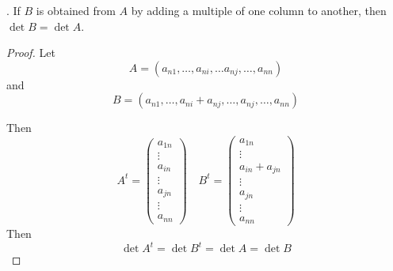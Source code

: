 \documentclass[12pt, a4paper]{article}
\begin{document}
. If $B$ is obtained from $A$ by adding a multiple of one column to another,
then $\det B = \det A$.
\begin{proof}
    Let 
    \[
        A = \left(a_{n1}, \dots, a_{ni}, \dots a_{nj}, \dots, a_{nn}\right)
    \]
    and
    \[
        B = \left(a_{n1}, \dots, a_{ni} + a_{nj}, \dots, a_{nj}, \dots, a_{nn}\right)
    \]

    Then
    \[
        A^t = \begin{pmatrix}
            a_{1n}\\ \vdots\\
            a_{in}\\ \vdots\\
            a_{jn}\\ \vdots\\
            a_{nn}
        \end{pmatrix}
        \quad
        B^t = \begin{pmatrix}
            a_{1n}\\ \vdots\\
            a_{in} + a_{jn}\\ \vdots\\
            a_{jn}\\ \vdots\\
            a_{nn}
        \end{pmatrix}
    \]
    Then
    \[
        \det A^t = \det B^t = \det A = \det B
    \]
\end{proof}
\end{document}
